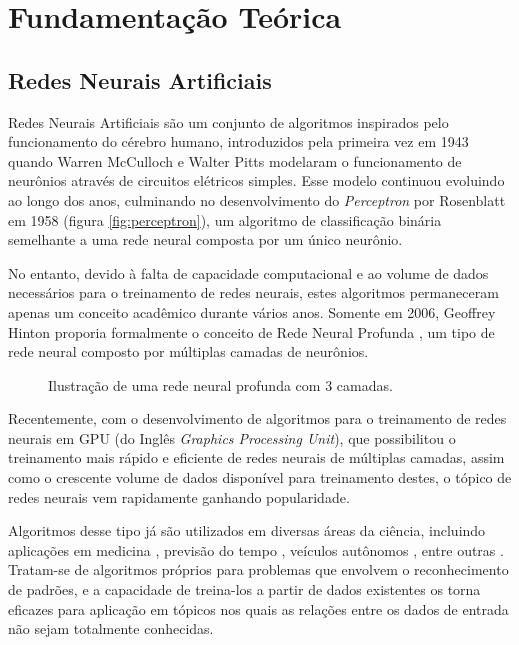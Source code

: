 \chapter{Fundamentação Teórica}

\section{Redes Neurais Artificiais}
\label{sec:dnn}

Redes Neurais Artificiais são um conjunto de algoritmos inspirados pelo funcionamento do cérebro humano, introduzidos pela primeira vez em 1943 quando Warren McCulloch e Walter Pitts modelaram o funcionamento de neurônios através de circuitos elétricos simples\cite{mccullochLogicalCalculusIdeas1943}. 
Esse modelo continuou evoluindo ao longo dos anos, culminando no desenvolvimento do \textit{Perceptron} por Rosenblatt em 1958 \cite{rosenblattPerceptronProbabilisticModel1958} (figura \ref{fig:perceptron}), um algoritmo de classificação binária semelhante a uma rede neural composta por um único neurônio.

No entanto, devido à falta de capacidade computacional e ao volume de dados necessários para o treinamento de redes neurais, estes algoritmos permaneceram apenas um conceito acadêmico durante vários anos.
Somente em 2006, Geoffrey Hinton proporia formalmente o conceito de Rede Neural Profunda \cite{hintonFastLearningAlgorithm2006}, um tipo de rede neural composto por múltiplas camadas de neurônios.

\begin{figure}[ht]
    \centering
    
    \caption{Ilustração de uma rede neural profunda com 3 camadas.}
    \label{fig:dnn}
\end{figure}

Recentemente, com o desenvolvimento de algoritmos para o treinamento de redes neurais em GPU (do Inglês \textit{Graphics Processing Unit}), que possibilitou o treinamento mais rápido e eficiente de redes neurais de múltiplas camadas, assim como o crescente volume de dados disponível para treinamento destes, o tópico de redes neurais vem rapidamente ganhando popularidade.

Algoritmos desse tipo já são utilizados em diversas áreas da ciência, incluindo aplicações em medicina \cite{hannunCardiologistLevelArrhythmiaDetection2019,phamPredictingHealthcareTrajectories2017,houDeepSFDeepConvolutional2018}, previsão do tempo \cite{akramSequenceSequenceWeather2016}, veículos autônomos \cite{bojarskiEndEndLearning2016,yudinObjectDetectionDeep2019}, entre outras \cite{abiodunStateoftheartArtificialNeural2018}.
Tratam-se de algoritmos próprios para problemas que envolvem o reconhecimento de padrões, e a capacidade de treina-los a partir de dados existentes os torna eficazes para aplicação em tópicos nos quais as relações entre os dados de entrada não sejam totalmente conhecidas.

